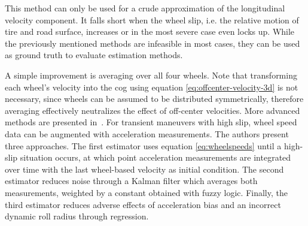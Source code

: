 This method can only be used for a crude approximation of the longitudinal velocity component. It falls short when the wheel slip, i.e. the relative motion of tire and road surface, increases or in the most severe case even locks up. While the previously mentioned methods are infeasible in most cases, they can be used as ground truth to evaluate estimation methods.

A simple improvement is averaging over all four wheels. Note that transforming each wheel's velocity into the \gls{cog} using equation \ref{eq:offcenter-velocity-3d} is not necessary, since wheels can be assumed to be distributed symmetrically, therefore averaging effectively neutralizes the effect of off-center velocities. More advanced methods are presented in~\cite{Song.2002}. For transient maneuvers with high slip, wheel speed data can be augmented with acceleration measurements. The authors present three approaches. The first estimator uses equation \ref{eq:wheelspeeds} until a high-slip situation occurs, at which point acceleration measurements are integrated over time with the last wheel-based velocity as initial condition. The second estimator reduces noise through a Kalman filter which averages both measurements, weighted by a constant obtained with fuzzy logic. Finally, the third estimator reduces adverse effects of acceleration bias and an incorrect dynamic roll radius through regression.
